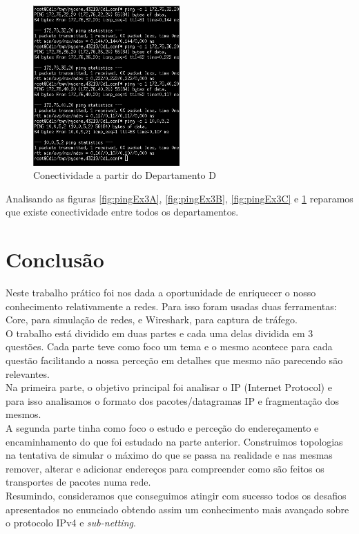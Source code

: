 \documentclass[a4paper]{report}
\begin{document}
\begin{figure}[H]
    \centering 
    \includegraphics[width=0.5\textwidth]{images/pingEx3D.png}
    \caption{Conectividade a partir do Departamento D}
    \label{fig:pingEx3D}
\end{figure}
Analisando as figuras \ref{fig:pingEx3A}, \ref{fig:pingEx3B}, \ref{fig:pingEx3C} e
\ref{fig:pingEx3D} reparamos que existe conectividade entre todos os departamentos.

\chapter{Conclusão}
Neste trabalho prático foi nos dada a oportunidade de enriquecer o nosso conhecimento
relativamente a redes. Para isso foram usadas duas ferramentas: Core, para simulação de 
redes, e Wireshark, para captura de tráfego.\\
O trabalho está dividido em duas partes e cada uma delas dividida em 3 questões.
Cada parte teve como foco um tema e o mesmo acontece para cada questão facilitando a
nossa perceção em detalhes que mesmo não parecendo são relevantes.\\
Na primeira parte, o objetivo principal foi analisar o IP (Internet Protocol) e para isso
analisamos o formato dos pacotes/datagramas IP e fragmentação dos mesmos.\\
A segunda parte tinha como foco o estudo e perceção do endereçamento e encaminhamento do
que foi estudado na parte anterior. Construimos topologias na tentativa de simular 
o máximo do que se passa na realidade e nas mesmas remover, alterar e adicionar 
endereços para compreender como são feitos os transportes de pacotes numa rede.\\
Resumindo, consideramos que conseguimos atingir com sucesso todos os
desafios apresentados no enunciado obtendo assim um conhecimento mais avançado
sobre o protocolo IPv4 e \textit{sub-netting}.
\end{document}

